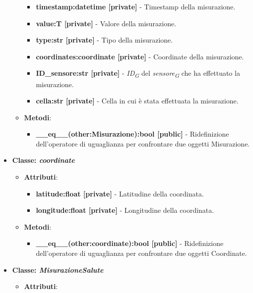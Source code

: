 \begin{itemize}
\begin{itemize}
    \begin{itemize}
        \item \textbf{timestamp:datetime [private]} - Timestamp della misurazione.
        \item \textbf{value:T [private]} - Valore della misurazione.
        \item \textbf{type:str [private]} - Tipo della misurazione.
        \item \textbf{coordinates:coordinate [private]} - Coordinate della misurazione.
        \item \textbf{ID\_sensore:str [private]} - \textit{ID}\textsubscript{\textit{G}} del \textit{sensore}\textsubscript{\textit{G}} che ha effettuato la misurazione.
        \item \textbf{cella:str [private]} - Cella in cui è stata effettuata la misurazione.
    \end{itemize}
    \item   \textbf{Metodi}: 
    \begin{itemize}
        \item \textbf{\_\_eq\_\_(other:Misurazione):bool [public]} - Ridefinizione dell'operatore di uguaglianza per confrontare due oggetti Misurazione.
    \end{itemize}
\end{itemize}
    \item\textbf{Classe: \textit{coordinate}}
    \begin{itemize}
        \item    \textbf{Attributi}: 
    \begin{itemize}
        \item \textbf{latitude:float [private]} - Latitudine della coordinata.
        \item \textbf{longitude:float [private]} - Longitudine della coordinata.
    \end{itemize}
    \item     \textbf{Metodi}: 
    \begin{itemize}
        \item \textbf{\_\_eq\_\_(other:coordinate):bool [public]} - Ridefinizione dell'operatore di uguaglianza per confrontare due oggetti Coordinate.
    \end{itemize}
\end{itemize}
\item\textbf{Classe: \textit{MisurazioneSalute}}
    \begin{itemize}
    \item\textbf{Attributi}:

\end{itemize}
\end{itemize}
